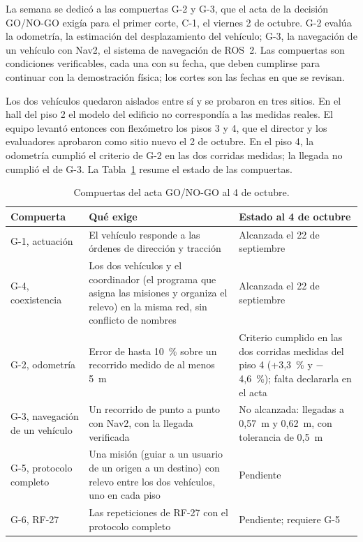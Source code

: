 \documentclass[12pt,letterpaper]{article}
\begin{document}
La semana se dedicó a las compuertas G-2 y G-3, que el acta de la decisión GO/NO-GO exigía para el primer corte, C-1, el viernes 2 de octubre. G-2 evalúa la odometría, la estimación del desplazamiento del vehículo; G-3, la navegación de un vehículo con Nav2, el sistema de navegación de ROS~2. Las compuertas son condiciones verificables, cada una con su fecha, que deben cumplirse para continuar con la demostración física; los cortes son las fechas en que se revisan.

Los dos vehículos quedaron aislados entre sí y se probaron en tres sitios. En el hall del piso 2 el modelo del edificio no correspondía a las medidas reales. El equipo levantó entonces con flexómetro los pisos 3 y 4, que el director y los evaluadores aprobaron como sitio nuevo el 2 de octubre. En el piso 4, la odometría cumplió el criterio de G-2 en las dos corridas medidas; la llegada no cumplió el de G-3. La Tabla~\ref{tab:compuertas} resume el estado de las compuertas.

\begin{table}[H]
    \centering
    \small
    \caption{Compuertas del acta GO/NO-GO al 4 de octubre.}
    \label{tab:compuertas}
    \begin{tabular}{@{}p{3.4cm}p{5.6cm}p{5.0cm}@{}}
        \toprule
        \textbf{Compuerta} & \textbf{Qué exige} & \textbf{Estado al 4 de octubre} \\ \midrule
        G-1, actuación & El vehículo responde a las órdenes de dirección y tracción & Alcanzada el 22 de septiembre \\ \addlinespace
        G-4, coexistencia & Los dos vehículos y el coordinador (el programa que asigna las misiones y organiza el relevo) en la misma red, sin conflicto de nombres & Alcanzada el 22 de septiembre \\ \addlinespace
        G-2, odometría & Error de hasta 10~\% sobre un recorrido medido de al menos 5~m & Criterio cumplido en las dos corridas medidas del piso 4 (+3,3~\% y $-$4,6~\%); falta declararla en el acta \\ \addlinespace
        G-3, navegación de un vehículo & Un recorrido de punto a punto con Nav2, con la llegada verificada & No alcanzada: llegadas a 0,57~m y 0,62~m, con tolerancia de 0,5~m \\ \addlinespace
        G-5, protocolo completo & Una misión (guiar a un usuario de un origen a un destino) con relevo entre los dos vehículos, uno en cada piso & Pendiente \\ \addlinespace
        G-6, RF-27 & Las repeticiones de RF-27 con el protocolo completo & Pendiente; requiere G-5 \\ \bottomrule
    \end{tabular}
\end{table}
\end{document}
